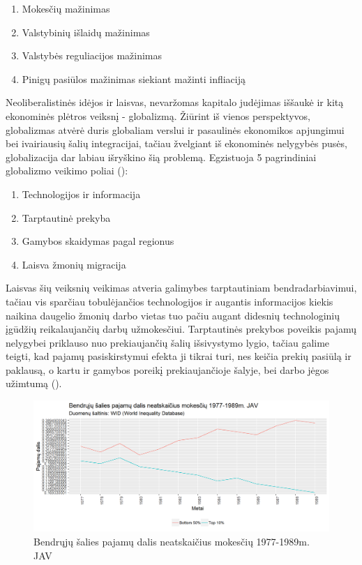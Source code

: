 \documentclass[12pt,a4paper,titlepage]{article}
\begin{document}
\begin{enumerate}
\item Mokesčių mažinimas
\item Valstybinių išlaidų mažinimas
\item Valstybės reguliacijos mažinimas
\item Pinigų pasiūlos mažinimas siekiant mažinti infliaciją
\end{enumerate}
Neoliberalistinės idėjos ir laisvas, nevaržomas kapitalo judėjimas iššaukė ir kitą ekonominės plėtros veiksnį - globalizmą. Žiūrint iš vienos perspektyvos, globalizmas atvėrė duris globaliam verslui ir pasaulinės ekonomikos apjungimui bei ivairiausių šalių integracijai, tačiau žvelgiant iš ekonominės nelygybės pusės, globalizacija dar labiau išryškino šią problemą. Egzistuoja 5 pagrindiniai globalizmo veikimo poliai (\cite{brian2015oecd}):
\begin{enumerate}
\item Technologijos ir informacija
\item Tarptautinė prekyba 
\item Gamybos skaidymas pagal regionus
\item Laisva žmonių migracija
\end{enumerate}
Laisvas šių veiksnių veikimas atveria galimybes tarptautiniam bendradarbiavimui, tačiau vis sparčiau tobulėjančios technologijos ir augantis informacijos kiekis naikina daugelio žmonių darbo vietas tuo pačiu augant didesnių technologinių įgūdžių reikalaujančių darbų užmokesčiui. Tarptautinės prekybos poveikis pajamų nelygybei priklauso nuo prekiaujančių šalių išsivystymo lygio, tačiau galime teigti, kad pajamų pasiskirstymui efekta ji tikrai turi, nes keičia prekių pasiūlą ir paklausą, o kartu ir gamybos poreikį prekiaujančioje šalyje, bei darbo jėgos užimtumą (\cite{misiukonyte2013globalizacijos}).

\begin{figure}[H]
\includegraphics[scale=0.7]{top10bot507789.png}
\caption{Bendrųjų šalies pajamų dalis neatskaičius mokesčių 1977-1989m. JAV}
\end{figure}
\end{document}
